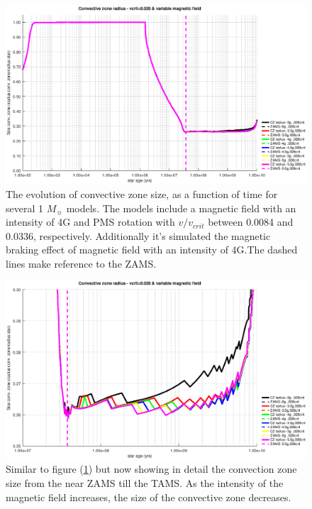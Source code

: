 \documentclass[fleqn,usenatbib]{mnras}
\begin{document}
\begin{figure}
	\includegraphics[width=\columnwidth]{figures/cz_vc_028_var_b.eps}
    \caption{The evolution of convective zone size, as a function of time for several 1 $M_{\sun}$ models. The models include a magnetic field with an intensity of 4G and PMS rotation with $v/v_{crit}$ between 0.0084 and 0.0336, respectively. Additionally it's simulated the magnetic braking effect of magnetic field with an intensity of 4G.The dashed lines make reference to the ZAMS.}
    \label{fig:cz_vc_028_var_b}
\end{figure}

\begin{figure}
	\includegraphics[width=\columnwidth]{figures/cz_vc_028_var_b_z1.eps}
    \caption{Similar to figure (\ref{fig:cz_vc_028_var_b}) but now showing in detail the convection zone size from the near ZAMS till the TAMS. As the intensity of the magnetic field increases, the size of the convective zone decreases.}
    \label{fig:cz_vc_028_var_b_z1}
\end{figure}
\end{document}
